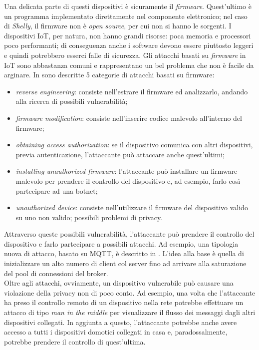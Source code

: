 \documentclass[binding=0.6cm,TFA]{sapthesis}
\begin{document}
\begin{large}
Una delicata parte di questi dispositivi è sicuramente il \textit{firmware}. Quest'ultimo è un programma implementato direttamente nel componente elettronico; nel caso di \textit{Shelly}, il firmware non è \textit{open source}, per cui non si hanno le sorgenti. I dispositivi IoT, per natura, non hanno grandi risorse: poca memoria e processori poco performanti; di conseguenza anche i software devono essere piuttosto leggeri e quindi potrebbero esserci falle di sicurezza. Gli attacchi basati su \textit{firmware} in IoT sono abbastanza comuni e rappresentano un bel problema che non è facile da arginare. In \cite{firmwareattack} sono descritte 5 categorie di attacchi basati su firmware:
\begin{itemize}
\item \textit{reverse engineering}: consiste nell'estrare il firmware ed analizzarlo, andando alla ricerca di possibili vulnerabilità;
\item \textit{firmware modification}: consiste nell'inserire codice malevolo all'interno del firmware;
\item \textit{obtaining access authorization}: se il dispositivo comunica con altri dispositivi, previa autenticazione, l'attaccante può attaccare anche quest'ultimi;
\item \textit{installing unauthorized firmware}: l'attaccante può installare un firmware malevolo per prendere il controllo del dispositivo e, ad esempio, farlo così partecipare ad una botnet;
\item \textit{unauthorized device}: consiste nell'utilizzare il firmware del dispositivo valido su uno non valido; possibili problemi di privacy. \\
\end{itemize}

Attraverso queste possibili vulnerabilità, l'attaccante può prendere il controllo del dispositivo e farlo partecipare a possibili attacchi. Ad esempio, una tipologia nuova di attacco, basato su MQTT, è descritto in \cite{articleSlowITe}. L'idea alla base è quella di inizializzare un alto numero di client col server fino ad arrivare alla saturazione del pool di connessioni del broker. \\

Oltre agli attacchi, ovviamente, un dispositivo vulnerabile può causare una violazione della privacy non di poco conto. Ad esempio, una volta che l'attaccante ha preso il controllo remoto di un dispositivo nella rete potrebbe effettuare un attacco di tipo \textit{man in the middle} per visualizzare il flusso dei messaggi dagli altri dispositivi collegati. In aggiunta a questo, l'attaccante potrebbe anche avere accesso a tutti i dispositivi domotici collegati in casa e, paradossalmente, potrebbe prendere il controllo di quest'ultima. \\

\end{large}
\end{document}
